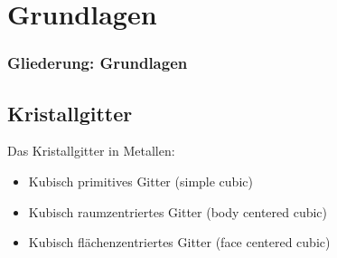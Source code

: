 \section{Grundlagen}

\begin{frame}[t]\frametitle{Gliederung: Grundlagen}
\tableofcontents[
currentsection,
subsectionstyle=show/show/hide
]
\end{frame}

\subsection{Kristallgitter}
\label{grnd:gitter}
\begin{frame}
	Das Kristallgitter in Metallen:
	\begin{itemize}
		\item{Kubisch primitives Gitter (simple cubic)}
		\item{Kubisch raumzentriertes Gitter (body centered cubic)}
		\item{Kubisch flächenzentriertes Gitter (face centered cubic)}
	\end{itemize}
\end{frame}
